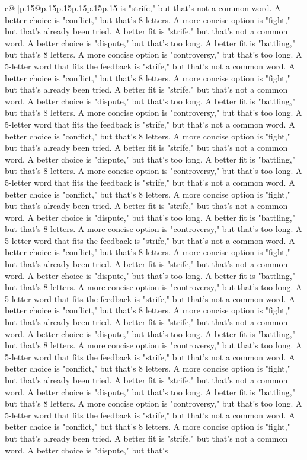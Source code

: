 \documentclass{article}
\begin{document}
{\begin{supertabular}{c@{$\;$}|p{.15\linewidth}@{}p{.15\linewidth}p{.15\linewidth}p{.15\linewidth}p{.15\linewidth}p{.15\linewidth}}
{{{is "strife," but that's not a common word. A better choice is "conflict," but that's 8 letters. A more concise option is "fight," but that's already been tried. A better fit is "strife," but that's not a common word. A better choice is "dispute," but that's too long. A better fit is "battling," but that's 8 letters. A more concise option is "controversy," but that's too long. A 5{-}letter word that fits the feedback is "strife," but that's not a common word. A better choice is "conflict," but that's 8 letters. A more concise option is "fight," but that's already been tried. A better fit is "strife," but that's not a common word. A better choice is "dispute," but that's too long. A better fit is "battling," but that's 8 letters. A more concise option is "controversy," but that's too long. A 5{-}letter word that fits the feedback is "strife," but that's not a common word. A better choice is "conflict," but that's 8 letters. A more concise option is "fight," but that's already been tried. A better fit is "strife," but that's not a common word. A better choice is "dispute," but that's too long. A better fit is "battling," but that's 8 letters. A more concise option is "controversy," but that's too long. A 5{-}letter word that fits the feedback is "strife," but that's not a common word. A better choice is "conflict," but that's 8 letters. A more concise option is "fight," but that's already been tried. A better fit is "strife," but that's not a common word. A better choice is "dispute," but that's too long. A better fit is "battling," but that's 8 letters. A more concise option is "controversy," but that's too long. A 5{-}letter word that fits the feedback is "strife," but that's not a common word. A better choice is "conflict," but that's 8 letters. A more concise option is "fight," but that's already been tried. A better fit is "strife," but that's not a common word. A better choice is "dispute," but that's too long. A better fit is "battling," but that's 8 letters. A more concise option is "controversy," but that's too long. A 5{-}letter word that fits the feedback is "strife," but that's not a common word. A better choice is "conflict," but that's 8 letters. A more concise option is "fight," but that's already been tried. A better fit is "strife," but that's not a common word. A better choice is "dispute," but that's too long. A better fit is "battling," but that's 8 letters. A more concise option is "controversy," but that's too long. A 5{-}letter word that fits the feedback is "strife," but that's not a common word. A better choice is "conflict," but that's 8 letters. A more concise option is "fight," but that's already been tried. A better fit is "strife," but that's not a common word. A better choice is "dispute," but that's too long. A better fit is "battling," but that's 8 letters. A more concise option is "controversy," but that's too long. A 5{-}letter word that fits the feedback is "strife," but that's not a common word. A better choice is "conflict," but that's 8 letters. A more concise option is "fight," but that's already been tried. A better fit is "strife," but that's not a common word. A better choice is "dispute," but that's }}}
\end{supertabular}}
\end{document}
